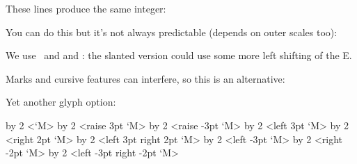 \typebuffer

These lines produce the same integer:

\startlines\tttf
\getbuffer
\stoplines

\page

You can do this but it's not always predictable (depends on outer scales too):

\startbuffer[definition]
\stopbuffer

\startbuffer[example]
We use \UnKernedTeX\ and {\bf \UnKernedTeX} and {\bs \UnKernedTeX}:
the slanted version could use some more left shifting of the E.
\stopbuffer


\startnarrower
\stopnarrower

Marks and cursive features can interfere, so this is an alternative:

\startbuffer[definition]
\stopbuffer

\typebuffer[definition]

\startnarrower
\stopnarrower

\page

Yet another glyph option:

\starttyping
\multiply\glyphscale by 2 <{\darkgray \glyph                      `M}>
\multiply\glyphscale by 2 <{\darkgray \glyph raise 3pt            `M}>
\multiply\glyphscale by 2 <{\darkgray \glyph raise -3pt           `M}>
\multiply\glyphscale by 2 <{\darkgray \glyph left  3pt            `M}>
\multiply\glyphscale by 2 <{\darkgray \glyph           right  2pt `M}>
\multiply\glyphscale by 2 <{\darkgray \glyph left  3pt right  2pt `M}>
\multiply\glyphscale by 2 <{\darkgray \glyph left -3pt            `M}>
\multiply\glyphscale by 2 <{\darkgray \glyph           right -2pt `M}>
\multiply\glyphscale by 2 <{\darkgray \glyph left -3pt right -2pt `M}>
\stoptyping

